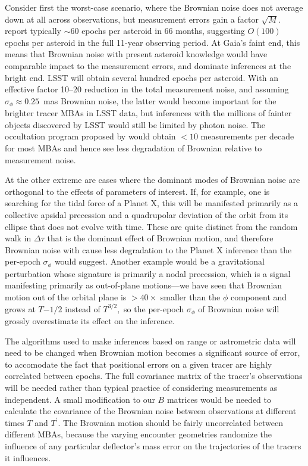 \documentclass[linenumbers, onecolumn]{aastex631}
\newcommand{\matB}{B}
\begin{document}
Consider first the worst-case scenario, where the Brownian noise does not average down at all across observations, but measurement errors gain a factor $\sqrt{M}.$   \citet{gaiafpr} report typically $\sim60$ epochs per asteroid in 66 months, suggesting $O(100)$ epochs per asteroid in the full 11-year observing period.  At Gaia's faint end, this means that Brownian noise with present asteroid knowledge would have comparable impact to the measurement errors, and dominate inferences at the bright end.  LSST will obtain several hundred epochs per asteroid.  With an effective factor 10--20 reduction in the total measurement noise, and assuming $\sigma_\phi\approx0.25$~mas Brownian noise, the latter would become important for the brighter tracer MBAs in LSST data, but inferences with the millions of fainter objects discovered by LSST would still be limited by photon noise.  The occultation program proposed by \citet{occultations} would obtain $<10$ measurements per decade for most MBAs and hence see less degradation of Brownian relative to measurement noise.

At the other extreme are cases where the dominant modes of Brownian noise are orthogonal to the effects of parameters of interest.  
If, for example, one is searching for the tidal force of a Planet X, this will be manifested primarily as a collective apsidal precession and a quadrupolar deviation of the orbit from its ellipse that does not evolve with time.  These are quite distinct from the random walk in $\Delta\tau$ that is the dominant effect of Brownian motion, and therefore Brownian noise with cause less degradation to the Planet X inference than the per-epoch $\sigma_\phi$ would suggest.  Another example would be a gravitational perturbation whose signature is primarily a nodal precession, which is a signal manifesting primarily as out-of-plane motions---we have seen that Brownian motion out of the orbital plane is $>40\times$ smaller than the $\phi$ component and grows at $T{-1/2}$ instead of $T^{3/2},$ so the per-epoch $\sigma_\phi$ of Brownian noise will grossly overestimate its effect on the inference.

The algorithms used to make inferences based on range or astrometric data will need to be changed when Brownian motion becomes a significant source of error, to accomodate the fact that positional errors on a given tracer are highly correlated between epochs.  The full covariance matrix of the tracer's observations will be needed rather than typical practice of considering measurements as independent.  A small modification to our $\matB$ matrices would be needed to calculate the covariance of the Brownian noise between observations at different times $T$ and $T^\prime.$  The Brownian motion should be fairly uncorrelated between different MBAs, because the varying encounter geometries randomize the influence of any particular deflector's mass error on the trajectories of the tracers it influences.
\end{document}
